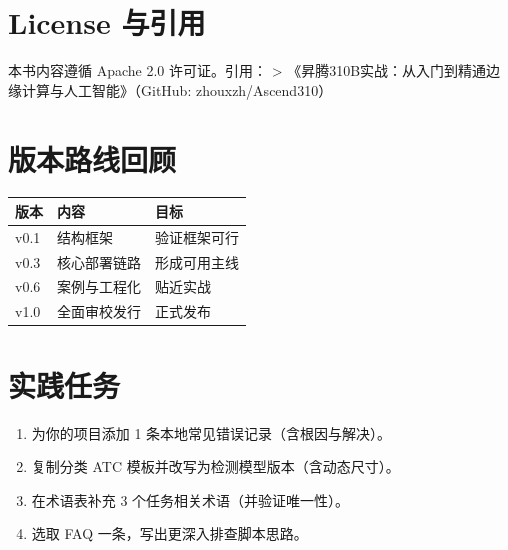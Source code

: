 \section{License 与引用}\label{src-appendix-appendix6-h12}

本书内容遵循 Apache 2.0 许可证。引用： \textgreater{}
《昇腾310B实战：从入门到精通边缘计算与人工智能》（GitHub:
zhouxzh/Ascend310）

\section{版本路线回顾}\label{src-appendix-appendix6-h13}

\begin{longtable}[]{@{}lll@{}}
\toprule\noalign{}
版本 & 内容 & 目标 \\
\midrule\noalign{}
\endhead
\bottomrule\noalign{}
\endlastfoot
v0.1 & 结构框架 & 验证框架可行 \\
v0.3 & 核心部署链路 & 形成可用主线 \\
v0.6 & 案例与工程化 & 贴近实战 \\
v1.0 & 全面审校发行 & 正式发布 \\
\end{longtable}

\section{实践任务}\label{src-appendix-appendix6-h14}

\begin{enumerate}
\def\labelenumi{\arabic{enumi}.}
\tightlist
\item
  为你的项目添加 1 条本地常见错误记录（含根因与解决）。
\item
  复制分类 ATC 模板并改写为检测模型版本（含动态尺寸）。
\item
  在术语表补充 3 个任务相关术语（并验证唯一性）。
\item
  选取 FAQ 一条，写出更深入排查脚本思路。
\end{enumerate}
